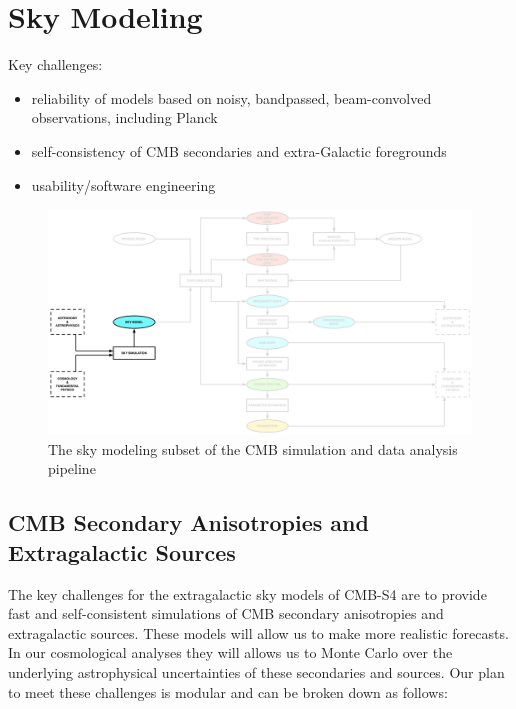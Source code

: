 
\section{Sky Modeling}

Key challenges: 
\begin{itemize} 
\item reliability of models based on noisy, bandpassed, beam-convolved observations, including Planck
\item self-consistency of CMB secondaries and extra-Galactic foregrounds
\item usability/software engineering
\end{itemize} 

\begin{figure}[htbp]
\centering
\includegraphics[width=1\textwidth]{Analysis/sm}
\caption{The sky modeling subset of the CMB simulation and data analysis pipeline}
\label{default}
\end{figure}

\subsection{CMB Secondary Anisotropies and Extragalactic Sources}

The key challenges for the extragalactic sky models of CMB-S4 are to provide fast and self-consistent simulations of CMB secondary anisotropies and extragalactic sources. These models will allow us to make more realistic forecasts. In our cosmological analyses they will allows us to Monte Carlo over the underlying astrophysical uncertainties of these secondaries and sources. Our plan to meet these challenges is modular and can be broken down as follows: 

